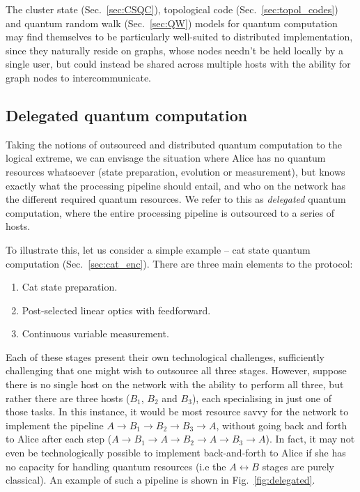\documentclass[aps, rmp, twocolumn, amsmath, amssymb, nofootinbib, superscriptaddress, longbibliography, floatfix, table-of-contents, eqsecnum]{revtex4-1}
\begin{document}
The cluster state (Sec.~\ref{sec:CSQC}), topological code (Sec.~\ref{sec:topol_codes}) and quantum random walk (Sec.~\ref{sec:QW}) models for quantum computation may find themselves to be particularly well-suited to distributed implementation, since they naturally reside on graphs, whose nodes needn't be held locally by a single user, but could instead be shared across multiple hosts with the ability for graph nodes to intercommunicate.

%
%

\subsection{Delegated quantum computation} 

Taking the notions of outsourced and distributed quantum computation to the logical extreme, we can envisage the situation where Alice has no quantum resources whatsoever (state preparation, evolution or measurement), but knows exactly what the processing pipeline should entail, and who on the network has the different required quantum resources. We refer to this as \textit{delegated} quantum computation, where the entire processing pipeline is outsourced to a series of hosts.

To illustrate this, let us consider a simple example -- cat state quantum computation (Sec.~\ref{sec:cat_enc}). There are three main elements to the protocol:
\begin{enumerate}
\item Cat state preparation.
\item Post-selected linear optics with feedforward.
\item Continuous variable measurement.
\end{enumerate}

Each of these stages present their own technological challenges, sufficiently challenging that one might wish to outsource all three stages. However, suppose there is no single host on the network with the ability to perform all three, but rather there are three hosts ($B_1$, $B_2$ and $B_3$), each specialising in just one of those tasks. In this instance, it would be most resource savvy for the network to implement the pipeline \mbox{$A\to B_1\to B_2\to B_3\to A$}, without going back and forth to Alice after each step (\mbox{$A\to B_1\to A\to B_2 \to A\to B_3\to A$}). In fact, it may not even be technologically possible to implement back-and-forth to Alice if she has no capacity for handling quantum resources (i.e the \mbox{$A\leftrightarrow B$} stages are purely classical). An example of such a pipeline is shown in Fig.~\ref{fig:delegated}.
\end{document}
